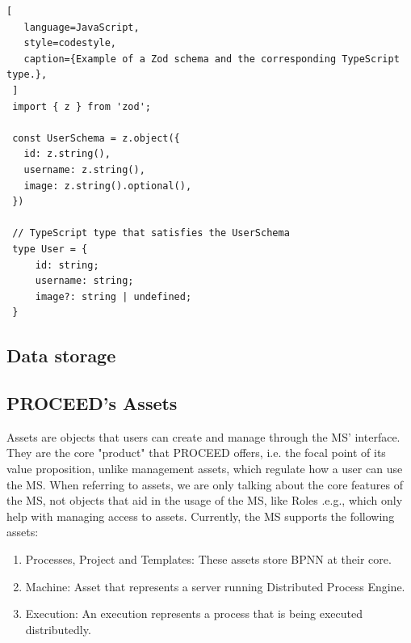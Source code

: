  \begin{lstlisting}[
   language=JavaScript,
   style=codestyle,
   caption={Example of a Zod schema and the corresponding TypeScript type.},
 ]
 import { z } from 'zod';

 const UserSchema = z.object({
   id: z.string(),
   username: z.string(),
   image: z.string().optional(),
 })

 // TypeScript type that satisfies the UserSchema
 type User = {
     id: string;
     username: string;
     image?: string | undefined;
 }
 \end{lstlisting}

 \subsection{Data storage}
 \label{cha:ms-architecture:data-storage}

%

\subsection{PROCEED's Assets}
\label{cha:relatedwork:proceed-assets}

Assets are objects that users can create and manage through the MS' interface.
They are the core "product" that PROCEED offers, i.e. the focal point of its value
proposition,
unlike management assets, which regulate how a user can use the MS.
When referring to assets, we are only talking about the core features of the MS, not
objects that aid in the usage of the MS, like Roles .e.g., which only help with managing
access to assets.
Currently, the MS supports the following assets:

\begin{enumerate}
	\item Processes, Project and Templates: These assets store BPNN at their core.
	\item Machine: Asset that represents a server running Distributed Process Engine. 
	\item Execution: An execution represents a process that is being executed distributedly.
\end{enumerate}

